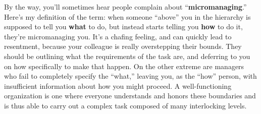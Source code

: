 By the way, you'll sometimes hear people complain about
``\textbf{micromanaging}.'' Here's my definition of the term: when someone
``above'' you in the hierarchy is supposed to tell you \textbf{what} to do,
but instead starts telling you \textbf{how} to do it, they're micromanaging
you. It's a chafing feeling, and can quickly lead to resentment, because your
colleague is really overstepping their bounds. They should be outlining what
the requirements of the task are, and deferring to you on how specifically to
make that happen. On the other extreme are managers who fail to completely
specify the ``what,'' leaving you, as the ``how'' person, with insufficient
information about how you might proceed. A well-functioning organization is
one where everyone understands and honors these boundaries and is thus able to
carry out a complex task composed of many interlocking levels.

